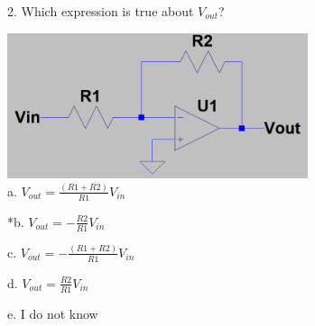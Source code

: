  
2. Which expression is true about $V_{out}$?

\includegraphics[width=3.46829in,height=1.68229in]{../../Images/OPampsTransistorsDiodesQ2.png} \\

a. \( V_{out} = \frac{(R1 + R2)}{R1} V_{in} \)

*b. \( V_{out} = - \frac{R2}{R1} V_{in} \) 

c. \( V_{out} = - \frac{(R1 + R2)}{R1} V_{in} \)

d. \( V_{out} = \frac{R2}{R1} V_{in} \)

e. I do not know \\

